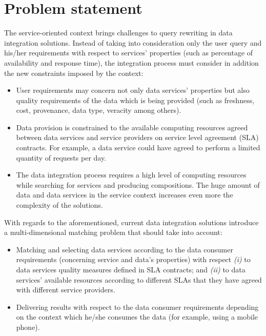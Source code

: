 \section{Problem statement}\label{problem}
%
The service-oriented context brings challenges to query rewriting in data integration solutions.
%
Instead of taking into consideration only the user query and his/her requirements with respect to services' properties (such as percentage of availability and response time), the integration process must consider in addition the new constraints imposed by the context: 
%
\begin{itemize}
\renewcommand{\labelitemi}{$-$}
\item User requirements may concern not only data services' properties but also quality requirements of the data which is being provided (such as freshness, cost, provenance, data type, veracity among others).
%
\item Data provision is constrained to the available computing resources agreed between data services and service providers on service level agreement (SLA) contracts. For example, a data service could have agreed to perform a limited quantity of requests per day.
%
\item The data integration process requires a high level of computing resources while searching for services and producing compositions.
The huge amount of data and data services in the service context increases even 
more the complexity of the solutions.
\end{itemize}
%
With regards to the aforementioned, current data integration solutions introduce a multi-dimensional matching problem that should take into account:
%
\begin{itemize}
\renewcommand{\labelitemi}{$-$}
%
\item Matching and selecting data services according to the data consumer requirements (concerning service and data's properties) with respect \textit{(i)} to data 
services quality measures defined in SLA contracts; and \textit{(ii)} to data services' available resources according to different SLAs that they have agreed with different service providers.
%
%
\item Delivering results with respect to the data consumer requirements depending on the context which he/she consumes the data (for example, using a mobile phone).
\end{itemize}
%

